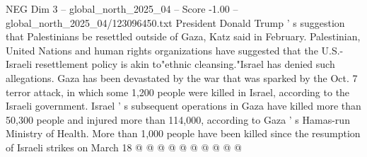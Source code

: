\begin{textsample}{NEG Dim 3 – global\_north\_2025\_04 – Score -1.00 – global\_north\_2025\_04/123096450.txt}
President Donald Trump ' s suggestion that Palestinians be resettled outside of Gaza, Katz said in February.
Palestinian, United Nations and human rights organizations have suggested that the U.S.-Israeli resettlement policy is akin to"ethnic cleansing."Israel has denied such allegations.
Gaza has been devastated by the war that was sparked by the Oct. 7 terror attack, in which some 1,200 people were killed in Israel, according to the Israeli government.
Israel ' s subsequent operations in Gaza have killed more than 50,300 people and injured more than 114,000, according to Gaza ' s Hamas-run Ministry of Health.
More than 1,000 people have been killed since the resumption of Israeli strikes on March 18 @ @ @ @ @ @ @ @ @ @

\end{textsample}
